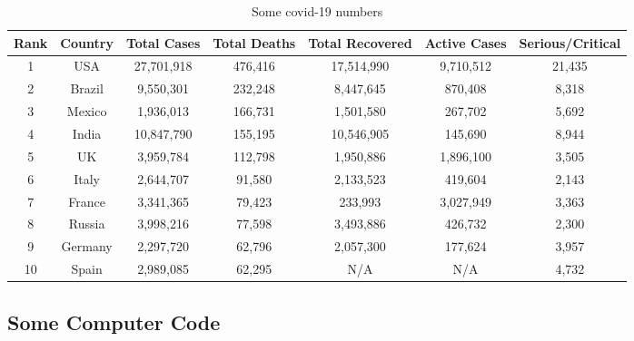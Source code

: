 \documentclass[11pt,letterpaper,twoside]{book}
\begin{document}
\begin{table}


\hspace{-1.5in}\begin{tabular}{ccccccc}
\toprule[1pt]
Rank & Country & Total Cases & Total Deaths & Total Recovered & Active Cases & Serious/Critical	\\
\toprule[1pt]
  1  & USA     & 27,701,918  &  476,416	    & 17,514,990      & 9,710,512    &  21,435	        \\
  2  & Brazil  &  9,550,301  &  232,248	    &  8,447,645      &   870,408    &   8,318	        \\
  3  & Mexico  &  1,936,013  &  166,731     &  1,501,580      &   267,702    &   5,692	        \\
  4  & India   & 10,847,790  &  155,195	    & 10,546,905      &   145,690    &   8,944   	\\
  5  & UK      &  3,959,784  &  112,798	    &  1,950,886      & 1,896,100    &   3,505	        \\
  6  & Italy   &  2,644,707  &   91,580     &  2,133,523      &   419,604    &   2,143	        \\
  7  & France  &  3,341,365  &   79,423	    &    233,993      & 3,027,949    &   3,363	        \\
  8  & Russia  &  3,998,216  &   77,598     &  3,493,886      &   426,732    &   2,300	        \\
  9  & Germany &  2,297,720  &   62,796	    &  2,057,300      &   177,624    &   3,957	        \\
  10 & Spain   &  2,989,085  &   62,295     &	 N/A          &     N/A	     &   4,732	        \\
\bottomrule[1pt]
\end{tabular}


\hspace{-1.5in}\caption{\label{tab:covidnums}Some covid-19 numbers}

\end{table}


\lipsum[2]

\subsection{Some Computer Code}
\end{document}

